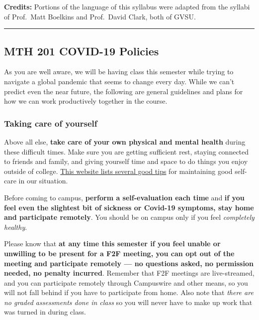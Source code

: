 \documentclass[]{article}
\begin{document}
\textbf{Credits:} Portions of the language of this syllabus were adapted
from the syllabi of Prof.~Matt Boelkins and Prof.~David Clark, both of
GVSU.

\begin{center}\rule{0.5\linewidth}{\linethickness}\end{center}

\hypertarget{mth-201-covid-19-policies}{%
\subsection{MTH 201 COVID-19 Policies}\label{mth-201-covid-19-policies}}

As you are well aware, we will be having class this semester while
trying to navigate a global pandemic that seems to change every day.
While we can't predict even the near future, the following are general
guidelines and plans for how we can work productively together in the
course.

\hypertarget{taking-care-of-yourself}{%
\subsubsection{Taking care of yourself}\label{taking-care-of-yourself}}

Above all else, \textbf{take care of your own physical and mental
health} during these difficult times. Make sure you are getting
sufficient rest, staying connected to friends and family, and giving
yourself time and space to do things you enjoy outside of college.
\href{https://www.mayoclinichealthsystem.org/hometown-health/speaking-of-health/self-care-tips-during-the-covid-19-pandemic}{This
website lists several good tips} for maintaining good self-care in our
situation.

Before coming to campus, \textbf{perform a self-evaluation each time}
and \textbf{if you feel even the slightest bit of sickness or Covid-19
symptoms, stay home and participate remotely}. You should be on campus
only if you feel \emph{completely healthy}.

Please know that \textbf{at any time this semester if you feel unable or
unwilling to be present for a F2F meeting, you can opt out of the
meeting and participate remotely --- no questions asked, no permission
needed, no penalty incurred}. Remember that F2F meetings are
live-streamed, and you can participate remotely through Campuswire and
other means, so you will not fall behind if you have to participate from
home. Also note that \emph{there are no graded assessments done in
class} so you will never have to make up work that was turned in during
class.
\end{document}
